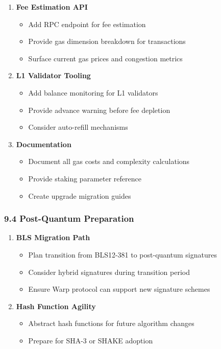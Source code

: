 \documentclass[
]{article}
\providecommand{\tightlist}{%
  \setlength{\itemsep}{0pt}\setlength{\parskip}{0pt}}
\begin{document}
\begin{enumerate}
\def\labelenumi{\arabic{enumi}.}
\item
  \textbf{Fee Estimation API}

  \begin{itemize}
  \tightlist
  \item
    Add RPC endpoint for fee estimation
  \item
    Provide gas dimension breakdown for transactions
  \item
    Surface current gas prices and congestion metrics
  \end{itemize}
\item
  \textbf{L1 Validator Tooling}

  \begin{itemize}
  \tightlist
  \item
    Add balance monitoring for L1 validators
  \item
    Provide advance warning before fee depletion
  \item
    Consider auto-refill mechanisms
  \end{itemize}
\item
  \textbf{Documentation}

  \begin{itemize}
  \tightlist
  \item
    Document all gas costs and complexity calculations
  \item
    Provide staking parameter reference
  \item
    Create upgrade migration guides
  \end{itemize}
\end{enumerate}

\subsubsection{9.4 Post-Quantum
Preparation}\label{94-post-quantum-preparation}

\begin{enumerate}
\def\labelenumi{\arabic{enumi}.}
\item
  \textbf{BLS Migration Path}

  \begin{itemize}
  \tightlist
  \item
    Plan transition from BLS12-381 to post-quantum signatures
  \item
    Consider hybrid signatures during transition period
  \item
    Ensure Warp protocol can support new signature schemes
  \end{itemize}
\item
  \textbf{Hash Function Agility}

  \begin{itemize}
  \tightlist
  \item
    Abstract hash functions for future algorithm changes
  \item
    Prepare for SHA-3 or SHAKE adoption
  \end{itemize}
\end{enumerate}
\end{document}
